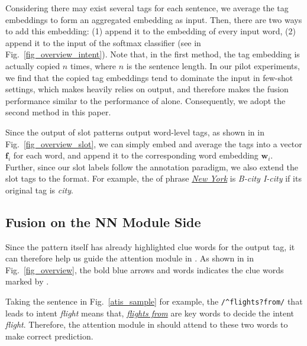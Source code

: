 Considering there may exist several \RE tags for each sentence, we average the tag embeddings to form an aggregated embedding as input.
Then, there are two ways to add this embedding: (1) append it to the embedding of every input word, (2) append it to the input of the softmax classifier (see  in Fig.~\ref{fig_overview_intent}).
Note that, in the first method, the tag embedding is actually copied $n$ times, where $n$ is the sentence length.
In our pilot experiments, we find that the copied tag embeddings tend to dominate the input in few-shot settings, which makes \NN heavily relies on \RE output, and therefore makes the fusion performance similar to the performance of \RE alone. Consequently, we adopt the second method in this paper.

Since the output of slot \RE patterns output word-level tags, as shown in  in Fig.~\ref{fig_overview_slot}, we can simply embed
and average the \RE tags into a vector $\textbf{f}_i$ for each word, and append it to the corresponding word embedding $\textbf{w}_i$.
Further, since our slot labels follow the \BIO annotation paradigm, we also extend the slot \RE tags to the \BIO format. For example, the
\REtag of phrase \textsl{\underline{New York}} is \emph{B-city I-city} if its original tag is \emph{city}.

\subsection{Fusion on the NN Module Side}
\label{interact_with_module}
Since the \RE pattern itself has already highlighted clue words for the output tag, it can therefore help us guide the attention module in \NN.
As shown in  in Fig.~\ref{fig_overview}, the bold blue arrows and words indicates the clue words marked by \RE.

Taking the sentence in Fig.~\ref{atis_sample} for example, the \RE \texttt{/\textasciicircum flights?\:from/} that leads to intent \emph{flight} means that, \textsl{\underline{flights from}} are key words to decide the intent \emph{flight}. Therefore, the attention module in \NN should attend to these two words to make correct prediction.

